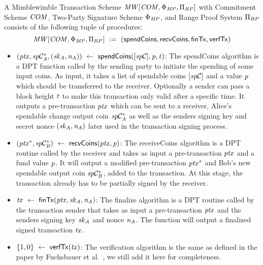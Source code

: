 \begin{definition}
    \label{def:atom:mw-tx-scheme}
    A Mimblewimble Transaction Scheme $\mathit{MW}[\mathit{COM},\Phi_{\mathit{MP}},\Pi_{RP}]$ with Commitment Scheme $\mathit{COM}$, Two-Party Signature Scheme $\Phi_{\mathit{MP}}$, and Range Proof System $\Pi_{RP}$ consists of the following tuple of procedures:
    \[ \mathit{MW}[\mathit{COM},\Phi_{\mathit{MP}},\Pi_{RP}] ~:=~ ( \mathsf{spendCoins},\mathsf{recvCoins},\mathsf{finTx},\mathsf{verfTx} ) \]
    \begin{itemize}
        \item $(\mathit{ptx}, \mathit{sp}\mathcal{C}_{\mathit{A}}^*, (\mathit{sk}_{\mathit{A}}, \mathit{\mathit{n}_{\mathit{A}}})) ~\leftarrow~ \mathsf{spendCoins}([\mathit{sp}\mathcal{C}],\mathit{p},\mathit{t})$: The spendCoins algorithm is a DPT function called by the sending party to initiate the spending of some input coins.
        As input, it takes a list of spendable coins $[\mathit{sp}\mathcal{C}]$ and a value $\mathit{p}$ which should be transferred to the receiver.
        Optionally a sender can pass a block height $\mathit{t}$ to make this transaction only valid after a specific time.
        It outputs a pre-transaction $\mathit{ptx}$ which can be sent to a receiver, Alice's spendable change output coin $\mathit{sp}\mathcal{C}_{\mathit{A}}^*$ as well as the senders signing key and secret nonce $(\mathit{sk}_{\mathit{A}}, \mathit{\mathit{n}_{\mathit{A}}})$ later used in the transaction signing process.
        \item $(\mathit{ptx}^*, \mathit{sp}\mathcal{C}_{\mathit{B}}^*) ~\leftarrow~ \mathsf{recvCoins}(\mathit{ptx},\mathit{p})$: The receiveCoins algorithm is a DPT routine called by the receiver and takes as input a pre-transaction $\mathit{ptx}$ and a fund value
        $\mathit{p}$.
        It will output a modified pre-transaction $\mathit{ptx}^*$ and Bob's new spendable output coin $\mathit{sp}\mathcal{C}_{\mathit{B}}^*$, added to the transaction.
        At this stage, the transaction already has to be partially signed by the receiver.
        \item $\mathit{tx} ~\leftarrow~ \mathsf{finTx}(\mathit{ptx},\mathit{sk}_{\mathit{A}},\mathit{\mathit{n}_{\mathit{A}}})$: The finalize algorithm is a DPT routine called by the transaction sender that takes as input a pre-transaction $\mathit{ptx}$ and the senders signing key $\mathit{sk}_{\mathit{A}}$ and nonce $\mathit{\mathit{n}_{\mathit{A}}}$.
        The function will output a finalized signed transaction $\mathit{tx}$.
        \item $\{1,0\} ~\leftarrow~ \mathsf{verfTx}(\mathit{tx})$: The verification algorithm is the same as defined in the paper by Fuchsbauer et al.~\cite{fuchsbauer2019aggregate}, we still add it here for completeness.

\end{itemize}
\end{definition}
